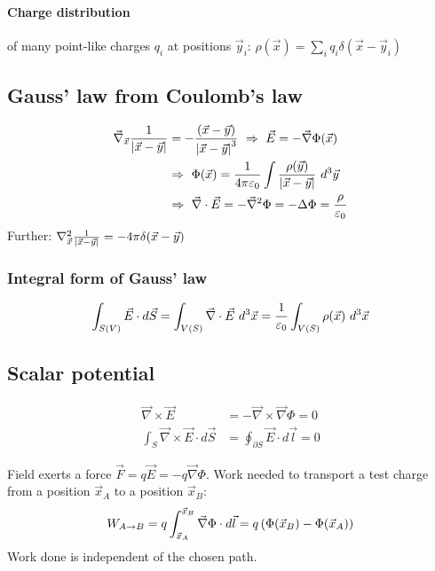 \paragraph{Charge distribution} of many point-like charges $q_i$ at positions $\vec{y}_i$:
$\rho(\vec{x}) = \sum_i q_i \delta(\vec{x} - \vec{y}_i)$

\subsection{Gauss' law from Coulomb's law}
\begin{align*}
    \vec{\nabla}_{\vec{x}} \frac{1}{\left\vert \vec{x} - \vec{y} \right\vert} &= - \frac{(\vec{x} - \vec{y})}{\left\vert \vec{x} - \vec{y} \right\vert^3}
    \ \Rightarrow \ \vec{E} = - \vec{\nabla} \Phi(\vec{x})
    \\
    &\Rightarrow \
    \Phi(\vec{x}) = \frac{1}{4 \pi \varepsilon_0} \int \frac{\rho(\vec{y})}{\left\vert \vec{x} - \vec{y} \right\vert} \ d^3 \vec{y}
    \\
    &\Rightarrow \ \vec{\nabla} \cdot \vec{E} = - \vec{\nabla}^2 \Phi = - \Delta \Phi
    = \frac{\rho}{\varepsilon_0}
\end{align*}
Further: $\mathbf{\nabla}^2_{\vec{x}} \frac{1}{\left\vert \vec{x} - \vec{y} \right\vert}
= - 4 \pi \delta(\vec{x} - \vec{y})$

\subsubsection{Integral form of Gauss' law}

\begin{align*}
    \int_{S(V)} \vec{E} \cdot d \vec{S}
    = \int_{V(S)} \vec{\nabla} \cdot \vec{E} \ d^3 \vec{x}
    = \frac{1}{\varepsilon_0} \int_{V(S)} \rho(\vec{x}) \ d^3 \vec{x}
\end{align*}

\subsection{Scalar potential}

\begin{align*}
    \vec{\nabla} \times \vec{E} &= - \vec{\nabla} \times \vec{\nabla} \Phi = 0
    \\
    \int_S \vec{\nabla} \times \vec{E} \cdot d \vec{S}
    &= \oint_{\partial S} \vec{E} \cdot d \vec{l} = 0
\end{align*}

Field exerts a force $\vec{F} = q \vec{E} = - q \vec{\nabla} \Phi$.
Work needed to transport a test charge from a position $\vec{x}_A$ to
a position $\vec{x}_B$:
\begin{align*}
    W_{A \rightarrow B} = q \int_{\vec{x}_A}^{\vec{x}_B} \vec{\nabla} \Phi \cdot d \vec{l}
    = q \left( \Phi(\vec{x}_B) - \Phi(\vec{x}_A) \right)
\end{align*}
Work done is independent of the chosen path.

